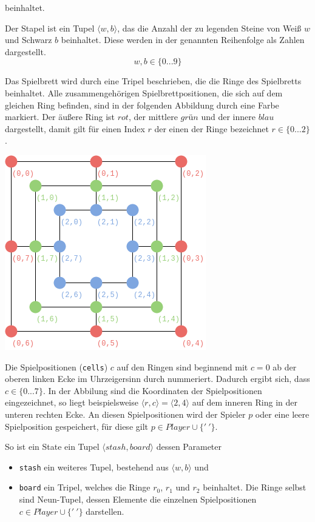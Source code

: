 \documentclass[11pt]{article}
\providecommand{\tightlist}{%
      \setlength{\itemsep}{0pt}\setlength{\parskip}{0pt}}
\begin{document}
beinhaltet.

Der Stapel ist ein Tupel \(\langle w, b \rangle\), das die Anzahl der zu
legenden Steine von Weiß \(w\) und Schwarz \(b\) beinhaltet. Diese
werden in der genannten Reihenfolge als Zahlen dargestellt.
\[w, b \in \{0...9\}\]

Das Spielbrett wird durch eine Tripel beschrieben, die die Ringe des
Spielbretts beinhaltet. Alle zusammengehörigen Spielbrettpositionen, die
sich auf dem gleichen Ring befinden, sind in der folgenden Abbildung
durch eine Farbe markiert. Der äußere Ring ist \(rot\), der mittlere
\(grün\) und der innere \(blau\) dargestellt, damit gilt für einen Index
\(r\) der einen der Ringe bezeichnet \(r \in \{0...2\}\).

\includegraphics{../images/nmm-rings.png}

Die Spielpositionen (\texttt{cells}) \(c\) auf den Ringen sind beginnend
mit \(c=0\) ab der oberen linken Ecke im Uhrzeigersinn durch nummeriert.
Dadurch ergibt sich, dass \(c \in \{0...7\}\). In der Abbilung sind die
Koordinaten der Spielpositionen eingezeichnet, so liegt beispielsweise
\(\langle r,c \rangle = \langle 2,4 \rangle\) auf dem inneren Ring in
der unteren rechten Ecke. An diesen Spielpositionen wird der Spieler
\(p\) oder eine leere Spielposition gespeichert, für diese gilt
\(p \in Player \cup \{'\ '\}\).

So ist ein State ein Tupel \(\langle stash, board \rangle\) dessen
Parameter

\begin{itemize}
\tightlist
\item
  \texttt{stash} ein weiteres Tupel, bestehend aus
  \(\langle w, b \rangle\) und
\item
  \texttt{board} ein Tripel, welches die Ringe \(r_0\), \(r_1\) und
  \(r_2\) beinhaltet. Die Ringe selbst sind Neun-Tupel, dessen Elemente
  die einzelnen Spielpositionen \(c \in Player \cup \{'\ '\}\)
  darstellen.
\end{itemize}
\end{document}
